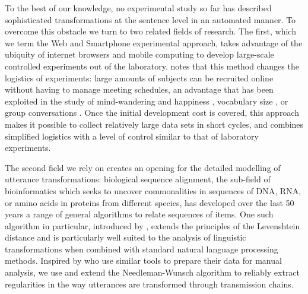 \documentclass[a4paper,fleqn]{cas-dc}
\begin{document}
To the best of our knowledge, no experimental study so far has described sophisticated transformations at the sentence level in an automated manner.
To overcome this obstacle we turn to two related fields of research. The
first, which we term the Web and Smartphone experimental approach, %
takes advantage of the ubiquity of internet browsers and mobile computing to develop
large-scale controlled experiments out of the laboratory.
\citet{miller_smartphone_2012} %
notes that this method changes the logistics %
of experiments: large amounts of subjects can be recruited online without
having to manage meeting schedules, %
an advantage
that has been exploited in the study of mind-wandering and happiness
\citep{killingsworth_wandering_2010,mackerron_happiness_2013,bastian_language_2017},
 vocabulary size
\citep{keuleers_word_2015,brysbaert_how_2016}, %
or group conversations \citep[][which also involves many subjects simultaneously]{niculae_conversational_2016}.
Once the initial development cost is covered, this approach makes it
possible to collect relatively large data sets in short cycles, and
combines simplified logistics with a level of control similar to that of
laboratory experiments.

The second field we rely on creates an opening for the detailed
modelling of utterance transformations: biological sequence alignment,
the sub-field of bioinformatics which seeks to uncover commonalities in
sequences of DNA, RNA, or amino acids in proteins from different
species, has developed over the last 50 years a range of general
algorithms to relate sequences of items. One such algorithm in
particular, introduced by \citet{needleman_general_1970}, extends the
principles of the Levenshtein distance and is particularly well suited
to the analysis of linguistic transformations when combined with
standard natural language processing methods. Inspired by
\citet{lauf_analyzing_2013} who use similar tools to prepare their
data for manual analysis, we use and extend the Needleman-Wunsch
algorithm to reliably extract regularities in the way utterances are
transformed through transmission chains.
\end{document}
